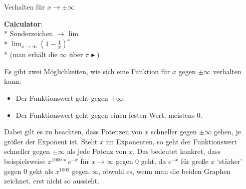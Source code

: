 \clearpage
\begin{bla}{Verhalten für $x\rightarrow \pm \infty$}
  \begin{marginfigure}
    \begin{tcolorbox}[colback=white!95!black,colframe=white!75!black,title=CAS:,arc=0mm]
      \begin{scriptsize}
        \textbf{Calculator}: \\*
        Sonderzeichen \( \to \) lim \\*
        \hfill \( \lim_{x \to \infty} {\left( 1- \tfrac{1}{x} \right)}^x \) \\*
        (man erhält die \( \infty \) über \( \pi \blacktriangleright \))
      \end{scriptsize}
    \end{tcolorbox}
  \end{marginfigure}
  \begin{marginfigure}
      \caption{$f(x)=e^{-x}$ geht für $x\rightarrow\infty$ gegen $0$.}
    \end{marginfigure}
  Es gibt zwei Möglichkeiten, wie sich eine Funktion für $x$ gegen $\pm \infty$ verhalten kann:
  \begin{itemize}
    \item Der Funktionswert geht gegen $\pm \infty$.
    \item Der Funktionswert geht gegen einen festen Wert, meistens $0$.
  \end{itemize}
  Dabei gilt es zu beachten, dass Potenzen von $x$ schneller gegen $\pm \infty$ gehen, je größer der Exponent ist. Steht $x$ im Exponenten, so geht der Funktionswert schneller gegen $\pm \infty$ als jede Potenz von $x$. Das bedeutet konkret, dass beispielsweise $x^{1000}*e^{-x}$ für $x \rightarrow \infty$ gegen $0$ geht, da $e^{-x}$ für große $x$ `stärker' gegen $0$ geht als $x^{1000}$ gegen $\infty$, obwohl es, wenn man die beiden Graphen zeichnet, erst nicht so aussieht.
\end{bla}



